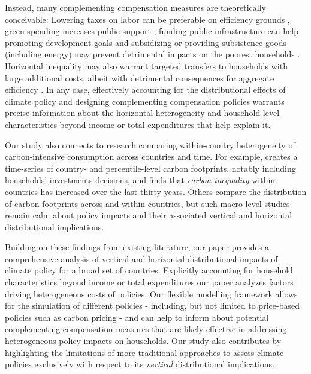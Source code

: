 \documentclass[12pt, a4paper]{article}
\begin{document}
Instead, many complementing compensation measures are theoretically conceivable: Lowering taxes on labor can be preferable on efficiency grounds \autocite{Goulder.1995,Bento.2018}, green spending increases public support \autocite{Sommer.2022}, funding public infrastructure can help promoting development goals \autocite{Franks.2018,Jakob.2016} and subsidizing or providing subsistence goods (including energy) may prevent detrimental impacts on the poorest households \autocite{Greve.2022,Schaffitzel.2019}. Horizontal inequality may also warrant targeted transfers to households with large additional costs, albeit with detrimental consequences for aggregate efficiency \autocite{Hansel.2022}. In any case, effectively accounting for the distributional effects of climate policy and designing complementing compensation policies warrants precise information about the horizontal heterogeneity and household-level characteristics beyond income or total expenditures that help explain it. 

Our study also connects to research comparing within-country heterogeneity of carbon-intensive consumption across countries and time. For example, \textcite{Chancel.2022} creates a time-series of country- and percentile-level carbon footprints, notably including households' investments decisions, and finds that \textit{carbon inequality} within countries has increased over the last thirty years. Others \autocite{Oswald.2020,Bruckner.2022} compare the distribution of carbon footprints across and within countries, but such macro-level studies remain calm about policy impacts and their associated vertical and horizontal distributional implications.

Building on these findings from existing literature, our paper provides a comprehensive analysis of vertical and horizontal distributional impacts of climate policy for a broad set of countries. Explicitly accounting for household characteristics beyond income or total expenditures our paper analyzes factors driving heterogeneous costs of policies. Our flexible modelling framework allows for the simulation of different policies - including, but not limited to price-based policies such as carbon pricing - and can help to inform about potential complementing compensation measures that are likely effective in addressing heterogeneous policy impacts on households. Our study also contributes by highlighting the limitations of more traditional approaches to assess climate policies exclusively with respect to its \textit{vertical} distributional implications.
\end{document}
